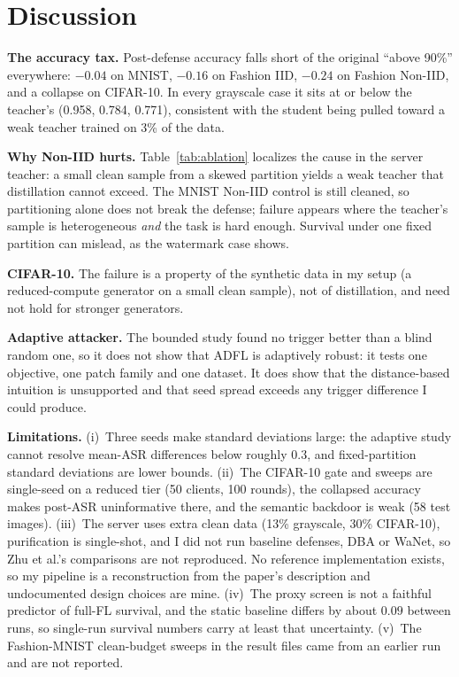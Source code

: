\documentclass[conference]{IEEEtran}
\begin{document}
\section{Discussion}

\textbf{The accuracy tax.} Post-defense accuracy falls short of the original ``above 90\%'' everywhere: $-0.04$ on MNIST, $-0.16$ on Fashion IID, $-0.24$ on Fashion Non-IID, and a collapse on CIFAR-10. In every grayscale case it sits at or below the teacher's (0.958, 0.784, 0.771), consistent with the student being pulled toward a weak teacher trained on 3\% of the data.

\textbf{Why Non-IID hurts.} Table~\ref{tab:ablation} localizes the cause in the server teacher: a small clean sample from a skewed partition yields a weak teacher that distillation cannot exceed. The MNIST Non-IID control is still cleaned, so partitioning alone does not break the defense; failure appears where the teacher's sample is heterogeneous \emph{and} the task is hard enough. Survival under one fixed partition can mislead, as the watermark case shows.

\textbf{CIFAR-10.} The failure is a property of the synthetic data in my setup (a reduced-compute generator on a small clean sample), not of distillation, and need not hold for stronger generators.

\textbf{Adaptive attacker.} The bounded study found no trigger better than a blind random one, so it does not show that ADFL is adaptively robust: it tests one objective, one patch family and one dataset. It does show that the distance-based intuition is unsupported and that seed spread exceeds any trigger difference I could produce.

\textbf{Limitations.} (i)~Three seeds make standard deviations large: the adaptive study cannot resolve mean-ASR differences below roughly $0.3$, and fixed-partition standard deviations are lower bounds. (ii)~The CIFAR-10 gate and sweeps are single-seed on a reduced tier (50 clients, 100 rounds), the collapsed accuracy makes post-ASR uninformative there, and the semantic backdoor is weak (58 test images). (iii)~The server uses extra clean data (13\% grayscale, 30\% CIFAR-10), purification is single-shot, and I did not run baseline defenses, DBA or WaNet, so Zhu et al.'s comparisons are not reproduced. No reference implementation exists, so my pipeline is a reconstruction from the paper's description and undocumented design choices are mine. (iv)~The proxy screen is not a faithful predictor of full-FL survival, and the static baseline differs by about $0.09$ between runs, so single-run survival numbers carry at least that uncertainty. (v)~The Fashion-MNIST clean-budget sweeps in the result files came from an earlier run and are not reported.
\end{document}
